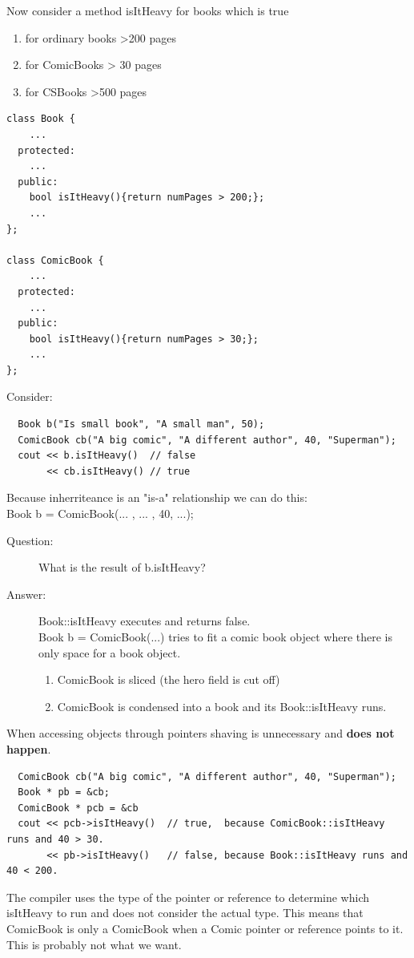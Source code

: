 \documentclass[english, 11pt]{article}
\begin{document}
Now consider a method isItHeavy for books which is true
\begin{enumerate}
  \item for ordinary books >200 pages
  \item for ComicBooks > 30 pages
  \item for CSBooks >500 pages
\end{enumerate}
\begin{lstlisting}
class Book {
    ...
  protected:
    ...
  public:
    bool isItHeavy(){return numPages > 200;};
    ...
};

class ComicBook {
    ...
  protected:
    ...
  public:
    bool isItHeavy(){return numPages > 30;};
    ...
};
\end{lstlisting}
Consider:
\begin{lstlisting}
  Book b("Is small book", "A small man", 50);
  ComicBook cb("A big comic", "A different author", 40, "Superman");
  cout << b.isItHeavy()  // false
       << cb.isItHeavy() // true
\end{lstlisting}

Because inherriteance is an "is-a" relationship we can do this: \\
{\ttfamily Book b = ComicBook(... , ... , 40, ...);} %
\begin{description}
  \item[Question:] What is the result of {\ttfamily b.isItHeavy}?
  \item[Answer:] {\ttfamily Book::isItHeavy} executes and returns false. \\
  {\ttfamily Book b = ComicBook(...)} tries to fit a comic book object where there is only space for a book object.
  \begin{enumerate}
    \item ComicBook is sliced (the hero field is cut off)
    \item ComicBook is condensed into a book and its {\ttfamily Book::isItHeavy} runs.
  \end{enumerate}
\end{description}
When accessing objects through pointers shaving is unnecessary and \textbf{does not happen}.
\begin{lstlisting}
  ComicBook cb("A big comic", "A different author", 40, "Superman");
  Book * pb = &cb;
  ComicBook * pcb = &cb
  cout << pcb->isItHeavy()  // true,  because ComicBook::isItHeavy runs and 40 > 30.
       << pb->isItHeavy()   // false, because Book::isItHeavy runs and 40 < 200.
\end{lstlisting}
The compiler uses the type of the pointer or reference to determine which {\ttfamily isItHeavy} to run and does not consider the actual type. This means that ComicBook is only a ComicBook when a Comic pointer or reference points to it. This is probably not what we want.
\end{document}
